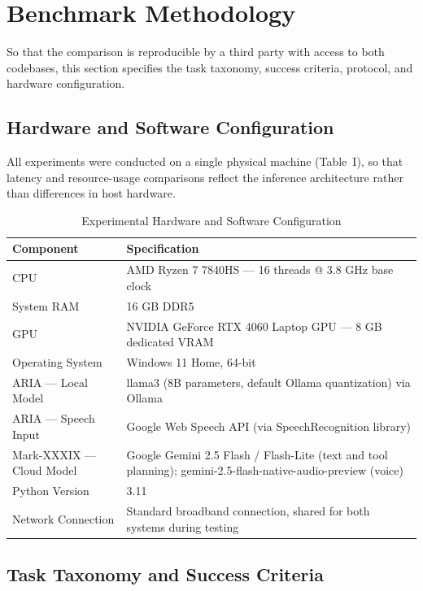 \documentclass[conference]{IEEEtran}
\begin{document}
\section{Benchmark Methodology}

So that the comparison is reproducible by a third party with access to both codebases, this section specifies the task taxonomy, success criteria, protocol, and hardware configuration.

\subsection{Hardware and Software Configuration}

All experiments were conducted on a single physical machine (Table~I), so that latency and resource-usage comparisons reflect the inference architecture rather than differences in host hardware.

\begin{table}[htbp]
\caption{Experimental Hardware and Software Configuration}
\label{tab:hw}
\centering
\small
\begin{tabular}{p{2.0cm}p{5.5cm}}
\toprule
\textbf{Component} & \textbf{Specification} \\
\midrule
CPU & AMD Ryzen 7 7840HS --- 16 threads @ 3.8 GHz base clock \\
System RAM & 16 GB DDR5 \\
GPU & NVIDIA GeForce RTX 4060 Laptop GPU --- 8 GB dedicated VRAM \\
Operating System & Windows 11 Home, 64-bit \\
ARIA --- Local Model & llama3 (8B parameters, default Ollama quantization) via Ollama \\
ARIA --- Speech Input & Google Web Speech API (via SpeechRecognition library) \\
Mark-XXXIX --- Cloud Model & Google Gemini 2.5 Flash / Flash-Lite (text and tool planning); gemini-2.5-flash-native-audio-preview (voice) \\
Python Version & 3.11 \\
Network Connection & Standard broadband connection, shared for both systems during testing \\
\bottomrule
\end{tabular}
\end{table}

\subsection{Task Taxonomy and Success Criteria}
\end{document}
